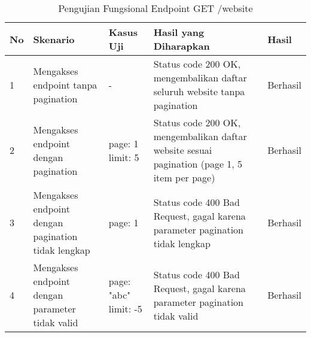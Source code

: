 \begin{table}[H]
    \centering
    \begin{tabular}{|p{0.5cm}|p{3cm}|p{5cm}|p{5cm}|p{1.5cm}|}
        \hline
        \rowcolor[HTML]{DAE8FC} 
        \textbf{No} & \textbf{Skenario} & \textbf{Kasus Uji} & \textbf{Hasil yang Diharapkan} & \textbf{Hasil} \\ \hline
        1 & Mengakses endpoint tanpa pagination & 
        - & 
        Status code 200 OK, mengembalikan daftar seluruh website tanpa pagination & 
        Berhasil \\ \hline
        2 & Mengakses endpoint dengan pagination & 
        page: 1 \newline limit: 5 & 
        Status code 200 OK, mengembalikan daftar website sesuai pagination (page 1, 5 item per page) & 
        Berhasil \\ \hline
        3 & Mengakses endpoint dengan pagination tidak lengkap & 
        page: 1 & 
        Status code 400 Bad Request, gagal karena parameter pagination tidak lengkap & 
        Berhasil \\ \hline
        4 & Mengakses endpoint dengan parameter tidak valid & 
        page: "abc" \newline limit: -5 & 
        Status code 400 Bad Request, gagal karena parameter pagination tidak valid & 
        Berhasil \\ \hline
    \end{tabular}
    \caption{Pengujian Fungsional Endpoint GET /website}
    \label{tab:website_getall_testing}
\end{table}
